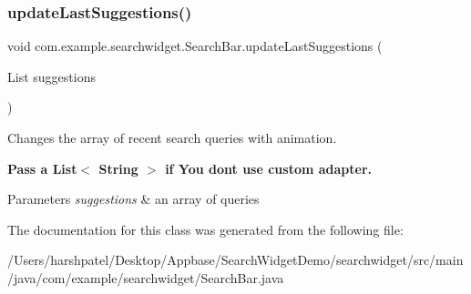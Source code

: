 \subsubsection{\texorpdfstring{updateLastSuggestions()}{updateLastSuggestions()}}
{\footnotesize\ttfamily void com.\+example.\+searchwidget.\+Search\+Bar.\+update\+Last\+Suggestions (\begin{DoxyParamCaption}\item[{List}]{suggestions }\end{DoxyParamCaption})}

Changes the array of recent search queries with animation. 

{\bfseries{Pass a List$<$ String $>$ if You don\textquotesingle{}t use custom adapter.}}


\begin{DoxyParams}{Parameters}
{\em suggestions} & an array of queries \\
\hline
\end{DoxyParams}


The documentation for this class was generated from the following file\+:\begin{DoxyCompactItemize}
\item 
/\+Users/harshpatel/\+Desktop/\+Appbase/\+Search\+Widget\+Demo/searchwidget/src/main/java/com/example/searchwidget/Search\+Bar.\+java\end{DoxyCompactItemize}
